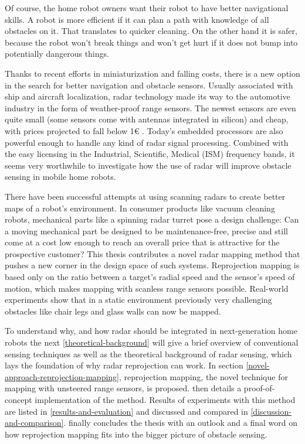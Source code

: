 Of course, the home robot owners want their robot to have better
navigational skills. A robot is more efficient if it can plan a path
with knowledge of all obstacles on it. That translates to quicker
cleaning. On the other hand it is safer, because the robot won't break
things and won't get hurt if it does not bump into potentially dangerous
things.

Thanks to recent efforts in miniaturization and falling costs, there is
a new option in the search for better navigation and obstacle sensors.
Usually associated with ship and aircraft localization, radar technology
made its way to the automotive industry in the form of weather-proof
range sensors. The newest sensors are even quite small (some sensors
come with antennas integrated in silicon) and cheap, with prices
projected to fall below 1€ \cite{Brouwer2015}. Today's embedded
processors are also powerful enough to handle any kind of radar signal
processing. Combined with the easy licensing in the Industrial,
Scientific, Medical (ISM) frequency bands, it seems very worthwhile to
investigate how the use of radar will improve obstacle sensing in mobile
home robots.

There have been successful attempts at using scanning radars to create better maps of a robot's environment. In consumer products like vacuum cleaning robots, mechanical parts like a spinning radar turret pose a design challenge: Can a moving mechanical part be designed to be maintenance-free, precise and still come at a cost low enough to reach an overall price that is attractive for the prospective customer? This thesis contributes a novel radar mapping method that pushes a new corner in the design space of such systems. Reprojection mapping is based only on the ratio between a target's radial speed and the sensor's speed of motion, which makes mapping with scanless range sensors possible. Real-world experiments show that in a static environment previously very challenging obstacles like chair legs and glass walls can now be mapped.

To understand why, and how radar should be integrated in next-generation home robots the next \cref{theoretical-background} will give a brief overview of conventional sensing techniques as well as the theoretical background of radar sensing, which lays the foundation of why radar reprojection can work. In section \cref{novel-approach-reprojection-mapping}, reprojection mapping, the novel technique for mapping with unsteered range sensors, is proposed.  then details a proof-of-concept implementation of the method. Results of experiments with this method are listed in \cref{results-and-evaluation} and discussed and compared in \cref{discussion-and-comparison}.  finally concludes the thesis with an outlook and a final word on how reprojection mapping fits into the bigger picture of obstacle sensing.